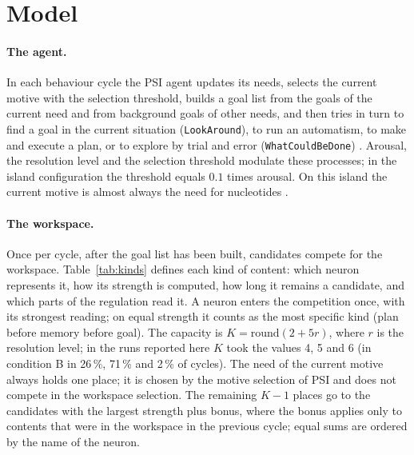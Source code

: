 \documentclass[11pt,a4paper]{article}
\newcommand{\code}[1]{\texttt{#1}}
\begin{document}
\section{Model}

\paragraph{The agent.} In each behaviour cycle the PSI agent updates its needs, selects the current motive with the selection threshold, builds a goal list from the goals of the current need and from background goals of other needs, and then tries in turn to find a goal in the current situation (\code{LookAround}), to run an automatism, to make and execute a plan, or to explore by trial and error (\code{WhatCouldBeDone}) \citep{doerner2002mechanik}. Arousal, the resolution level and the selection threshold modulate these processes; in the island configuration the threshold equals $0.1$ times arousal. On this island the current motive is almost always the need for nucleotides \citep{paper1}.

\paragraph{The workspace.} Once per cycle, after the goal list has been built, candidates compete for the workspace. Table~\ref{tab:kinds} defines each kind of content: which neuron represents it, how its strength is computed, how long it remains a candidate, and which parts of the regulation read it. A neuron enters the competition once, with its strongest reading; on equal strength it counts as the most specific kind (plan before memory before goal). The capacity is $K = \mathrm{round}(2 + 5 r)$, where $r$ is the resolution level; in the runs reported here $K$ took the values 4, 5 and 6 (in condition B in 26\,\%, 71\,\% and 2\,\% of cycles). The need of the current motive always holds one place; it is chosen by the motive selection of PSI and does not compete in the workspace selection. The remaining $K-1$ places go to the candidates with the largest strength plus bonus, where the bonus applies only to contents that were in the workspace in the previous cycle; equal sums are ordered by the name of the neuron.
\end{document}
